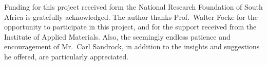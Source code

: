 
Funding for this project received form the National Research Foundation of South Africa is gratefully acknowledged. The author thanks Prof.~Walter Focke for the opportunity to participate in this project, and for the support received from the Institute of Applied Materials. Also, the seemingly endless patience and encouragement of Mr.~Carl Sandrock, in addition to the insights and suggestions he offered, are particularly appreciated.\\